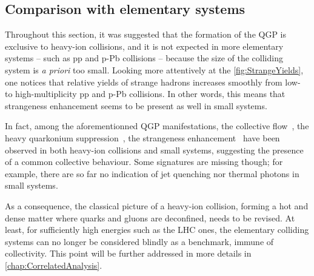 \subsection{Comparison with elementary systems}
\label{subsec:ComparisonPP}

Throughout this section, it was suggested that the formation of the QGP is exclusive to heavy-ion collisions, and it is not expected in more elementary systems -- such as pp and p-Pb collisions -- because the size of the colliding system is \textit{a priori} too small. Looking more attentively at the \fig\ref{fig:StrangeYields}, one notices that relative yields of strange hadrons increases smoothly from low- to high-multiplicity pp and p-Pb collisions. In other words, this means that strangeness enhancement seems to be present as well in small systems.

In fact, among the aforementionned QGP manifestations, the collective flow~\cite{schotterQCDLHC20222022}, the heavy quarkonium suppression~\cite{adamCentralityDependencePsi2016}, the strangeness enhancement~\cite{alicecollaborationEnhancedProductionMultistrange2017} have been observed in both heavy-ion collisions and small systems, suggesting the presence of a common collective behaviour. Some signatures are missing though; for example, there are so far no indication of jet quenching nor thermal photons in small systems.

As a consequence, the classical picture of a heavy-ion collision, forming a hot and dense matter where quarks and gluons are deconfined, needs to be revised. At least, for sufficiently high energies such as the LHC ones, the elementary colliding systems can no longer be considered blindly as a benchmark, immune of collectivity. This point will be further addressed in more details in \chap\ref{chap:CorrelatedAnalysis}.



